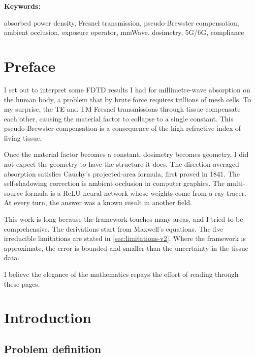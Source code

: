 \documentclass[11pt,a4paper]{article}
\theoremstyle{definition}      %
\newcommand{\keywords}[1]{%
  \par\smallskip\noindent\textbf{Keywords:}\enspace\parbox[t]{\dimexpr\linewidth-6.5em}{#1}\par\smallskip}
\begin{document}
\keywords{absorbed power density, Fresnel transmission, pseudo-Brewster compensation, ambient occlusion, exposure operator, mmWave, dosimetry, 5G/6G, compliance}

\tableofcontents
\newpage

\section*{Preface}

I set out to interpret some FDTD results I had for millimetre-wave absorption on the human body, a
problem that by brute force requires trillions of mesh cells.  To my surprise, the TE and
TM Fresnel transmissions through tissue compensate each other, causing the
material factor to collapse to a single constant.  This pseudo-Brewster
compensation is a consequence of the high refractive index of living tissue.

Once the material factor becomes a constant, dosimetry becomes geometry.
I did not expect the geometry to have the structure it does.  The
direction-averaged absorption satisfies Cauchy's projected-area formula,
first proved in 1841.  The self-shadowing correction is ambient
occlusion in computer graphics.  The multi-source formula is a ReLU
neural network whose weights come from a ray tracer.  At every turn, the
answer was a known result in another field.

This work is long because the framework touches many areas, and I tried to be comprehensive.  
The derivations start from Maxwell's equations.  The five irreducible limitations are stated in
\cref{sec:limitations-v2}.  Where the framework is approximate, the error
is bounded and smaller than the uncertainty in the tissue data.

I believe the elegance of the mathematics repays the effort of reading through these pages.

\newpage

\section{Introduction}\label{sec:introduction}

\subsection{Problem definition}
\end{document}
